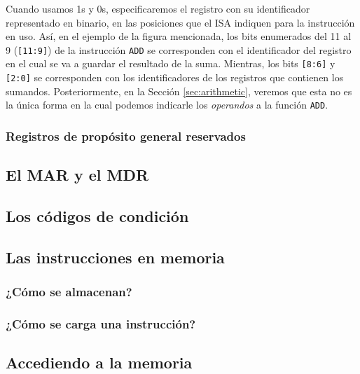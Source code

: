 \documentclass[a4paper, titlepage]{report}
\begin{document}
	Cuando usamos 1s y 0s, especificaremos el registro con su identificador representado en binario, en las posiciones que el ISA indiquen para la instrucción en uso. Así, en el ejemplo de la figura mencionada, los bits enumerados del 11 al 9 (\texttt{[11:9]}) de la instrucción \texttt{ADD} se corresponden con el identificador del registro en el cual se va a guardar el resultado de la suma. Mientras, los bits \texttt{[8:6]} y \texttt{[2:0]} se corresponden con los identificadores de los registros que contienen los sumandos. Posteriormente, en la Sección \ref{sec:arithmetic}, veremos que esta no es la única forma en la cual podemos indicarle los \textit{operandos} a la función \texttt{ADD}. %
	
	\subsubsection{Registros de propósito general reservados} %
	
	\subsection{El MAR y el MDR} %
	
	\subsection{Los códigos de condición} %
	
	\subsection{Las instrucciones en memoria} 
	
	\subsubsection{¿Cómo se almacenan?} %
	
	\subsubsection{¿Cómo se carga una instrucción?} %
	
	\subsection{Accediendo a la memoria} %
	
\end{document}
